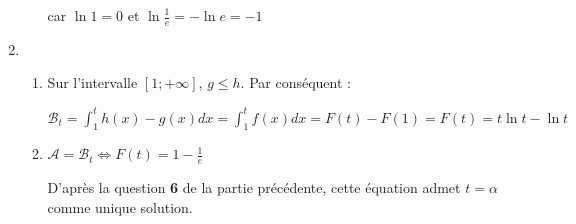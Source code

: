 \begin{corrige}
\begin{enumerate}
\begin{enumerate}
               \par
               car $\ln 1 = 0 $ et $ \ln \frac{1}{e} = -\ln e = -1$
          \end{enumerate}
          \item
          \begin{enumerate}[label=\alph*.]
               \item
               Sur l'intervalle $\left[1 ; +\infty \right]$, $g\leqslant h$. Par conséquent :
               \par
               $\mathscr B_{t}=\int_{1}^{t}h\left(x\right)-g\left(x\right)dx = \int_{1}^{t}f\left(x\right)dx = F\left(t\right)-F\left(1\right) = F\left(t\right) = t \ln t-\ln t$
               \item
               $\mathscr A=\mathscr B_{t}  \Leftrightarrow    F\left(t\right) = 1-\frac{1}{e}$
               \par
               D'après la question \textbf{6} de la partie précédente, cette équation admet $t=\alpha $ comme unique solution.
          \end{enumerate}
     \end{enumerate}
\end{corrige}
